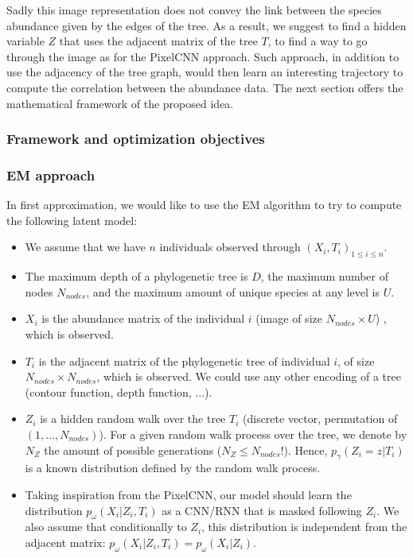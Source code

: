 Sadly this image representation does not convey the link between the species abundance given by the edges of the tree.
As a result, we suggest to find a hidden variable $Z$ that uses the adjacent matrix of the tree $T$, to find a way to go through the image
as for the PixelCNN approach.
Such approach, in addition to use the adjacency of the tree graph, would then learn an interesting trajectory to compute the correlation between the abundance data.
The next section offers the mathematical framework of the proposed idea.

\subsubsection{Framework and optimization objectives}

\subsubsection{EM approach}

In first approximation, we would like to use the EM algorithm to try to compute the following latent model:
\begin{itemize}
    \item We assume that we have $n$ individuals observed through $(X_i, T_i)_{1 \leq i \leq n}$.
    \item The maximum depth of a phylogenetic tree is $D$, the maximum number of nodes $N_{nodes}$, and the maximum amount of unique species at any level is $U$.
    \item $X_i$ is the abundance matrix of the individual $i$ (image of size $N_{nodes} \times U$) , which is observed.
    \item $T_i$ is the adjacent matrix of the phylogenetic tree of individual $i$, of size $N_{nodes} \times N_{nodes}$, which is observed.
          We could use any other encoding of a tree (contour function, depth function, ...).
    \item $Z_i$ is a hidden random walk over the tree $T_i$ (discrete vector, permutation of $(1, \dots, N_{nodes})$).
          For a given random walk process over the tree, we denote by $N_{Z}$ the amount of possible generations ($N_Z \leq N_{nodes}!$).
          Hence, $p_{\gamma}(Z_i = z | T_i)$ is a known distribution defined by the random walk process.
    \item Taking inspiration from the PixelCNN, our model should learn the distribution $p_{\omega}(X_i | Z_i, T_i)$ as a CNN/RNN that is masked following $Z_i$.
          We also assume that conditionally to $Z_i$, this distribution is independent from the adjacent matrix: $p_{\omega}(X_i | Z_i, T_i) = p_{\omega}(X_i | Z_i)$.
\end{itemize}

